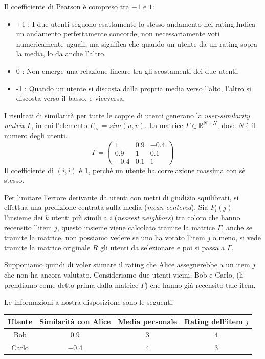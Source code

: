 Il coefficiente di Pearson è compreso tra \(-1\) e \(1\):
\begin{itemize}
    \item +1 : I due utenti seguono esattamente lo stesso andamento nei rating.Indica un andamento perfettamente concorde, non necessariamente voti numericamente uguali, ma significa che quando un utente da un rating sopra la media, lo da anche l'altro.
    \item 0 : Non emerge una relazione lineare tra gli scostamenti dei due utenti.
    \item -1 : Quando un utente si discosta dalla propria media verso l'alto, l'altro si discosta verso il basso, e viceversa.
\end{itemize} 



I risultati di similarità per tutte le coppie di utenti generano la \textit{user-similarity matrix} $\Gamma$, in cui l'elemento $\Gamma_{uv} = sim(u,v)$. La matrice $\Gamma \in \mathbb{R}^{N \times N }$, dove $N$ è il numero degli utenti.
\[
\Gamma =
\begin{pmatrix}
1 & 0.9 & -0.4\\
0.9 & 1 & 0.1\\
-0.4 & 0.1 & 1
\end{pmatrix}
\]
Il coefficiente di $(i,i)$ è 1, perchè un utente ha correlazione massima con sè stesso.





Per limitare l'errore derivante da utenti con metri di giudizio squilibrati, si effettua una predizione centrata sulla media (\textit{mean centered}).
Sia $P_i(j)$ l'insieme dei $k$ utenti più simili a $i$ (\textit{nearest neighbors}) tra coloro che hanno recensito l'item $j$, questo insieme viene calcolato tramite la matrice $\Gamma$, anche se tramite la matrice, non possiamo vedere se uno ha votato l'item $j$ o meno, si vede tramite la matrice originale $R$ gli utenti da selezionare e poi si passa a $\Gamma$.


Supponiamo quindi di voler stimare il rating che Alice assegnerebbe a un item $j$ che non ha ancora valutato. Consideriamo due utenti vicini, Bob e Carlo, (li prendiamo come detto prima dalla matrice $\Gamma$) che hanno già recensito tale item.

Le informazioni a nostra disposizione sono le seguenti:

\begin{center}
\begin{tabular}{|c|c|c|c|}
\hline
\textbf{Utente} & \textbf{Similarità con Alice} & \textbf{Media personale} & \textbf{Rating dell'item $j$} \\
\hline
Bob & $0.9$ & $3$ & $4$ \\
\hline
Carlo & $-0.4$ & $4$ & $3$ \\
\hline
\end{tabular}
\end{center}

